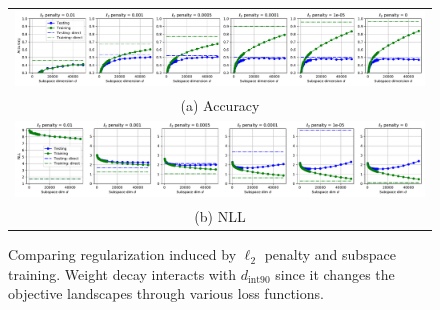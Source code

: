 \documentclass{article} %
\newcommand{\dintn}{d_{\mathrm{int90}}}
\begin{document}
\begin{figure}
  \centering
	\vspace{-2mm}
	\begin{tabular}{c}
		\hspace{-5mm}
		\includegraphics[width=14.4cm]{fnn_cifar_l2_reg/fnn_cifar_l2_reg_acc_all}
		\\
		(a) Accuracy \\
		\hspace{-5mm}
		\includegraphics[width=14.4cm]{fnn_cifar_l2_reg/fnn_cifar_l2_reg_nll_all}
		\\
		(b) NLL   %
	\end{tabular} \vspace{-2mm}
	\caption{Comparing regularization induced by $\ell_2$ penalty and subspace training. Weight decay interacts with $\dintn$ since it changes the objective landscapes through various loss functions. }
	\label{fig:fnn_cifar_l2}
	\vspace{-0mm}
\end{figure}
\end{document}
